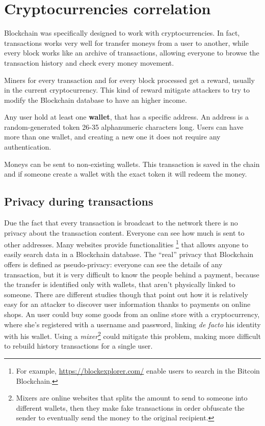 \section{Cryptocurrencies correlation}
\label{sec:crypto_corr}

Blockchain was specifically designed to work with cryptocurrencies. In fact,
transactions works very well for transfer moneys from a user to another, while
every block works like an archive of transactions, allowing everyone to browse
the transaction history and check every money movement.

Miners for every transaction and for every block processed get a reward,
usually in the current cryptocurrency. This kind of reward mitigate attackers to
try to modify the Blockchain database to have an higher income.

Any user hold at least one \textbf{wallet}, that has a specific address. An
address is a random-generated token 26-35 alphanumeric characters long. Users
can have more than one wallet, and creating a new one it does not require any
authentication.

Moneys can be sent to non-existing wallets. This transaction is saved in the
chain and if someone create a wallet with the exact token it will redeem
the money.

\subsection{Privacy during transactions}

Due the fact that every transaction is broadcast to the network there is no
privacy about the transaction content. Everyone can see how much is sent to
other addresses. Many websites provide functionalities
\footnote{For example, \url{https://blockexplorer.com/} enable users to search
in the Bitcoin Blockchain.} that allows anyone to easily search data in a
Blockchain database. The ``real'' privacy that Blockchain offers is defined as
pseudo-privacy: everyone can see the details of any transaction, but it is very
difficult to know the people behind a payment, because the transfer is
identified only with wallets, that aren't physically linked to someone. There
are different studies \cite{guadamuz15} though that point out how it is
relatively easy for an attacker to discover user information thanks to payments
on online shops. An user could buy some goods from an online store with a
cryptocurrency, where she's registered with a username and password, linking
\textit{de facto} his identity with his wallet. Using a
\textit{mixer}\footnote{Mixers are online websites that splits the amount to
send to someone into different wallets, then they make fake transactions in
order obfuscate the sender to eventually send the money to the original
recipient.} could mitigate this problem, making more difficult to rebuild
history transactions for a single user.

